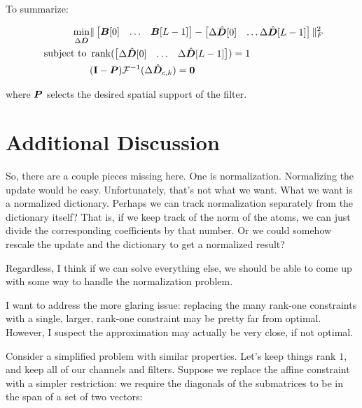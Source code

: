 \documentclass{article}
\begin{document}
To summarize:

\begin{equation}
\begin{aligned}
\min_{\Delta \hat{\bm{D}}} & \|\begin{bmatrix} \bm{B}[0] & \hdots & \bm{B}[L - 1] \end{bmatrix} - \begin{bmatrix} \Delta \hat{\bm{D}}[0] & \hdots \Delta \hat{\bm{D}}[L - 1] \end{bmatrix}\|_F^2 \\
\text{ subject to } & \operatorname{rank}(\begin{bmatrix} \Delta \hat{\bm{D}}[0] & \hdots & \Delta \hat{\bm{D}}[L - 1] \end{bmatrix}) = 1 \\
                    & ({\bf I} - \bm{P})\mathcal{F}^{-1}(\Delta \hat{\bm{D}}_{c,k}) = \bm{0}
\end{aligned}
\end{equation}

where $\bm{P}$ selects the desired spatial support of the filter. 


\section{Additional Discussion}

So, there are a couple pieces missing here. One is normalization. Normalizing the update would be easy. Unfortunately, that's not what we want. What we want is a normalized dictionary. Perhaps we can track normalization separately from the dictionary itself?  That is, if we keep track of the norm of the atoms, we can just divide the corresponding coefficients by that number. Or we could somehow rescale the update and the dictionary to get a normalized result?

Regardless, I think if we can solve everything else, we should be able to come up with some way to handle the normalization problem.

I want to address the more glaring issue: replacing the many rank-one constraints with a single, larger, rank-one constraint may be pretty far from optimal. However, I suspect the approximation may actually be very close, if not optimal.

Consider a simplified problem with similar properties. Let's keep things rank $1$, and keep all of our channels and filters. Suppose we replace the affine constraint with a simpler restriction: we require the diagonals of the submatrices to be in the span of a set of two vectors:
\end{document}
